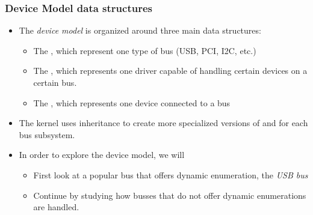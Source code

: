 \begin{frame}
  \frametitle{Device Model data structures}
  \begin{itemize}
  \item The {\em device model} is organized around three main data
    structures:
    \begin{itemize}
    \item The , which represent one type of bus
      (USB, PCI, I2C, etc.)
    \item The , which represents one driver
      capable of handling certain devices on a certain bus.
    \item The , which represents one device
      connected to a bus
    \end{itemize}
  \item The kernel uses inheritance to create more specialized
    versions of  and 
    for each bus subsystem.
  \item In order to explore the device model, we will
    \begin{itemize}
    \item First look at a popular bus that offers dynamic enumeration,
      the {\em USB bus}
    \item Continue by studying how busses that do not offer dynamic
      enumerations are handled.
    \end{itemize}
  \end{itemize}
\end{frame}

